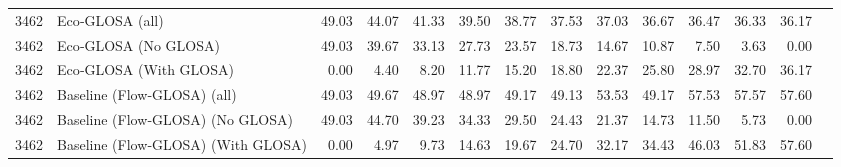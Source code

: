\begin{table}[ht]
{\begin{tabular}{llrrrrrrrrrrrr}
      \midrule
      3462 & Eco‐GLOSA (all)                     & 49.03 & 44.07 & 41.33 & 39.50 & 38.77 & 37.53 & 37.03 & 36.67 & 36.47 & 36.33 & 36.17 \\
      3462 & Eco‐GLOSA (No GLOSA)                & 49.03 & 39.67 & 33.13 & 27.73 & 23.57 & 18.73 & 14.67 & 10.87 &  7.50 &  3.63 &  0.00 \\
      3462 & Eco‐GLOSA (With GLOSA)              & 0.00  &  4.40 &  8.20 & 11.77 & 15.20 & 18.80 & 22.37 & 25.80 & 28.97 & 32.70 & 36.17 \\
      3462 & Baseline (Flow‐GLOSA) (all)         & 49.03 & 49.67 & 48.97 & 48.97 & 49.17 & 49.13 & 53.53 & 49.17 & 57.53 & 57.57 & 57.60 \\
      3462 & Baseline (Flow‐GLOSA) (No GLOSA)    & 49.03 & 44.70 & 39.23 & 34.33 & 29.50 & 24.43 & 21.37 & 14.73 & 11.50 &  5.73 &  0.00 \\
      3462 & Baseline (Flow‐GLOSA) (With GLOSA)  & 0.00  &  4.97 &  9.73 & 14.63 & 19.67 & 24.70 & 32.17 & 34.43 & 46.03 & 51.83 & 57.60 \\
      \bottomrule
    \end{tabular}%
  }
\end{table}


